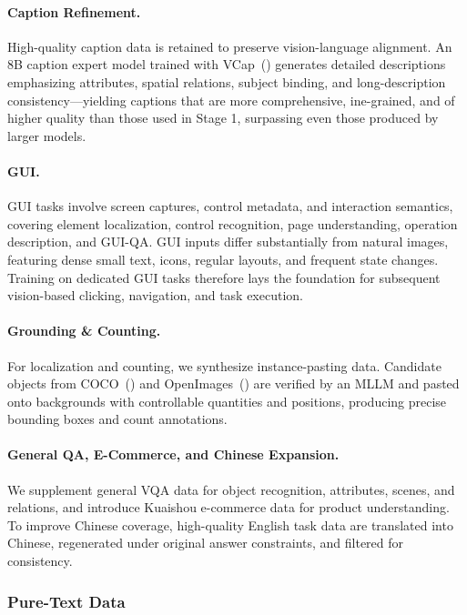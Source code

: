 \documentclass{llmxive}
\begin{document}
\paragraph{Caption Refinement.}
High-quality caption data is retained to preserve vision-language alignment. An 8B caption expert model trained with VCap~(\cite{vcap}) generates detailed descriptions emphasizing attributes, spatial relations, subject binding, and long-description consistency—yielding captions that are more comprehensive, ine-grained, and of higher quality than those used in Stage 1, surpassing even those produced by larger models.

\paragraph{GUI.}
GUI tasks involve screen captures, control metadata, and interaction semantics, covering element localization, control recognition, page understanding, operation description, and GUI-QA. GUI inputs differ substantially from natural images, featuring dense small text, icons, regular layouts, and frequent state changes. Training on dedicated GUI tasks therefore lays the foundation for subsequent vision-based clicking, navigation, and task execution.


\paragraph{Grounding \& Counting.}
For localization and counting, we synthesize instance-pasting data. Candidate objects from COCO~(\cite{coco}) and OpenImages~(\cite{openimages}) are verified by an MLLM and pasted onto backgrounds with controllable quantities and positions, producing precise bounding boxes and count annotations.

\paragraph{General QA, E-Commerce, and Chinese Expansion.}
We supplement general VQA data for object recognition, attributes, scenes, and relations, and introduce Kuaishou e-commerce data for product understanding. To improve Chinese coverage, high-quality English task data are translated into Chinese, regenerated under original answer constraints, and filtered for consistency.

\subsubsection{Pure-Text Data}
\end{document}
